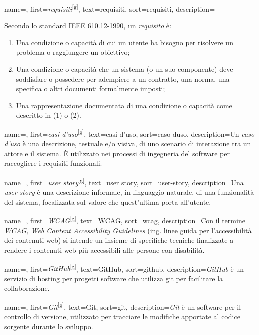  {
    name=,
    first={\textit{requisiti}\textsuperscript{[g]}},
    text=requisiti,
    sort=requisiti,
    description={Secondo lo standard IEEE 610.12-1990, un \emph{requisito} è:
    \begin{enumerate}
        \item Una condizione o capacità di cui un utente ha bisogno per risolvere un problema o raggiungere un obiettivo;
        \item Una condizione o capacità che un sistema (o un suo componente) deve soddisfare o possedere per adempiere a un contratto, una norma, una specifica o altri documenti formalmente imposti;
        \item Una rappresentazione documentata di una condizione o capacità come descritto in (1) o (2).
    \end{enumerate}
    }
}

 {
    name=,
    first={\textit{casi d'uso}\textsuperscript{[g]}},
    text=casi d'uso,
    sort=caso-duso,
    description={Un \emph{caso d'uso} è una descrizione, testuale e/o visiva, di uno scenario di interazione tra un attore e il sistema. È utilizzato nei processi di ingegneria del software per raccogliere i requisiti funzionali.}
}

 {
    name=,
    first={\textit{user story}\textsuperscript{[g]}},
    text=user story,
    sort=user-story,
    description={Una \emph{user story} è una descrizione informale, in linguaggio naturale, di una funzionalità del sistema, focalizzata sul valore che quest'ultima porta all'utente.}
}

 {
    name=,
    first={\textit{WCAG}\textsuperscript{[g]}},
    text=WCAG,
    sort=wcag,
    description={Con il termine \emph{WCAG, Web Content Accessibility Guidelines} (ing. linee guida per l'accessibilità dei contenuti web) si intende un insieme di specifiche tecniche finalizzate a rendere i contenuti web più accessibili alle persone con disabilità.}
}

 {
    name=,
    first={\textit{GitHub}\textsuperscript{[g]}},
    text=GitHub,
    sort=github,
    description={\emph{GitHub} è un servizio di hosting per progetti software che utilizza \gls{git} per facilitare la collaborazione.}
}

 {
    name=,
    first={\textit{Git}\textsuperscript{[g]}},
    text=Git,
    sort=git,
    description={\emph{Git} è un software per il controllo di versione, utilizzato per tracciare le modifiche apportate al codice sorgente durante lo sviluppo.}
}

